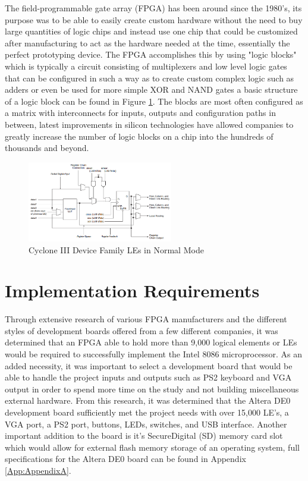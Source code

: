 \documentclass[11pt,peerreviewca]{IEEEtran}
\begin{document}
The field-programmable gate array (FPGA) has been around since the 1980's, its purpose was to be able to easily create custom hardware without the need to buy large quantities of logic chips and instead use one chip that could be customized after manufacturing to act as the hardware needed at the time, essentially the perfect prototyping device. The FPGA accomplishes this by using "logic blocks" which is typically a circuit consisting of multiplexers and low level logic gates that can be configured in such a way as to create custom complex logic such as adders or even be used for more simple XOR and NAND gates a basic structure of a logic block can be found in Figure \ref{fig:LogicElement}. The blocks are most often configured as a matrix with interconnects for inputs, outputs and configuration paths in between, latest improvements in silicon technologies have allowed companies to greatly increase the number of logic blocks on a chip into the hundreds of thousands and beyond.

\begin{figure}[!t]
\centering
\includegraphics[width=2.5in]{LogicElement}
\caption{Cyclone III Device Family LEs in Normal Mode \cite{CycloneHandbook}}
\label{fig:LogicElement}
\end{figure}

\section{Implementation Requirements}
Through extensive research of various FPGA manufacturers and the different styles of development boards offered from a few different companies, it was determined that an FPGA able to hold more than 9,000 logical elements or LEs would be required to successfully implement the Intel 8086 microprocessor. As an added necessity, it was important to select a development board that would be able to handle the project inputs and outputs such as PS2 keyboard and VGA output in order to spend more time on the study and not building miscellaneous external hardware.  From this research, it was determined that the Altera DE0 development board sufficiently met the project needs with over 15,000 LE's, a VGA port, a PS2 port, buttons, LEDs, switches, and USB interface. Another important addition to the board is it's SecureDigital (SD) memory card slot which would allow for external flash  memory storage of an operating system, full specifications for the Altera DE0 board can be found in Appendix \ref{App:AppendixA}.
\end{document}
